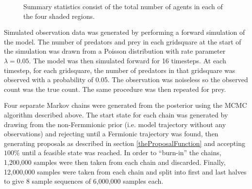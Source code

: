 \documentclass{article}
\begin{document}
\begin{figure}
	\centering
	\caption{Summary statistics consist of the total number of agents in each of the four shaded regions.}
	\label{figRegions}
\end{figure}


Simulated observation data was generated by performing a forward simulation of the model. The number of predators and prey in each gridsquare at the start of the simulation was drawn from a Poisson distribution with rate parameter $\lambda = 0.05$.  The model was then simulated forward for 16 timesteps. At each timestep, for each gridsquare, the number of predators in that gridsquare was observed with a probability of 0.05. The observation was noiseless so the observed count was the true count. The same procedure was then repeated for prey.

Four separate Markov chains were generated from the posterior using the MCMC algorithm described above. The start state for each chain was generated by drawing from the non-Fermmionic prior (i.e. model trajectory without any observations) and rejecting until a Fermionic trajectory was found, then generating proposals as described in section \ref{theProposalFunction} and accepting $100\%$ until a feasible state was reached. In order to ``burn-in'' the chains, 1,200,000 samples were then taken from each chain and discarded. Finally, 12,000,000 samples were taken from each chain and split into first and last halves to give 8 sample sequences of 6,000,000 samples each. 
\end{document}
